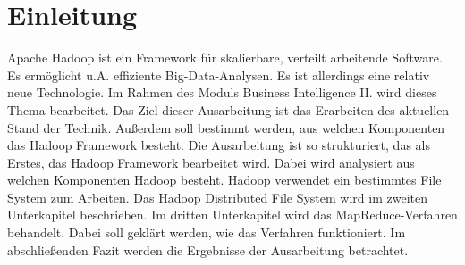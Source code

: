 \section{Einleitung}
Apache Hadoop ist ein Framework für skalierbare, verteilt arbeitende Software. Es ermöglicht u.A. effiziente Big-Data-Analysen. Es ist allerdings eine relativ neue Technologie. Im Rahmen des Moduls \glqq Business Intelligence II. \grqq wird dieses Thema bearbeitet. Das Ziel dieser Ausarbeitung ist das Erarbeiten des aktuellen Stand der Technik. Außerdem soll bestimmt werden, aus welchen Komponenten das Hadoop Framework besteht. Die Ausarbeitung ist so strukturiert, das als Erstes, das Hadoop Framework bearbeitet wird. Dabei wird analysiert aus welchen Komponenten Hadoop besteht. Hadoop verwendet ein bestimmtes File System zum Arbeiten. Das Hadoop Distributed File System wird im zweiten Unterkapitel beschrieben. Im dritten Unterkapitel wird das MapReduce-Verfahren behandelt. Dabei soll geklärt werden, wie das Verfahren funktioniert. Im abschließenden Fazit werden die Ergebnisse der Ausarbeitung betrachtet.